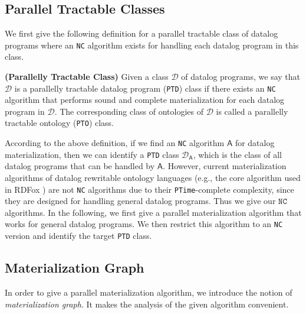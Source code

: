 \documentclass[final,1p,times]{elsarticle}
\begin{document}
\subsection{Parallel Tractable Classes}

We first give the following definition for a parallel tractable class of datalog programs
where an \texttt{NC} algorithm exists for handling each datalog program in this class.

\begin{definition}\label{def:ptd}
\textbf{(Parallelly Tractable Class)} Given a class $\mathcal{D}$ of datalog programs,
we say that $\mathcal{D}$ is a parallelly tractable datalog program (\texttt{PTD}) class
if there exists an \texttt{NC} algorithm that performs sound and complete materialization for each datalog program
in $\mathcal{D}$. The corresponding class of ontologies of $\mathcal{D}$ is called a
parallelly tractable ontology (\texttt{PTO}) class.
\end{definition}

According to the above definition, if we find an \texttt{NC} algorithm $\mathsf{A}$
for datalog materialization, then we can identify a \texttt{PTD} class $\mathcal{D}_{\mathsf{A}}$,
which is the class of all datalog programs that can be handled by $\mathsf{A}$.
However, current materialization algorithms of datalog rewritable ontology languages
(e.g., the core algorithm used in RDFox \cite{MotikNPHO14}) are not \texttt{NC} algorithms
due to their \texttt{PTime}-complete complexity, since they are designed for handling general datalog programs.
Thus we give our $\texttt{NC}$ algorithms.
In the following, we first give a parallel materialization algorithm that works for
general datalog programs. We then restrict this algorithm to an \texttt{NC} version
and identify the target \texttt{PTD} class.


\subsection{Materialization Graph}

In order to give a parallel materialization algorithm,
we introduce the notion of \emph{materialization graph}.
It makes the analysis of the given algorithm convenient.
\end{document}

